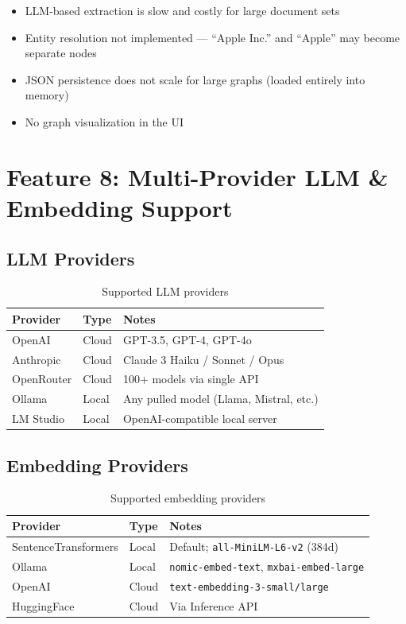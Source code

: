 \documentclass[12pt, a4paper, oneside]{report}
\newcommand{\kw}[1]{\texttt{\small #1}}
\begin{document}
\begin{conbox}[Drawbacks]
\begin{itemize}
  \item LLM-based extraction is slow and costly for large document sets
  \item Entity resolution not implemented — ``Apple Inc.'' and ``Apple'' may become separate nodes
  \item JSON persistence does not scale for large graphs (loaded entirely into memory)
  \item No graph visualization in the UI
\end{itemize}
\end{conbox}

\section{Feature 8: Multi-Provider LLM \& Embedding Support}

\subsection*{LLM Providers}

\begin{table}[H]
\centering
{}
\begin{tabularx}{\linewidth}{llX}
\toprule
\rowcolor{rapidblue!10}
\textbf{Provider} & \textbf{Type} & \textbf{Notes} \\
\midrule
OpenAI & Cloud & GPT-3.5, GPT-4, GPT-4o \\
Anthropic & Cloud & Claude 3 Haiku / Sonnet / Opus \\
OpenRouter & Cloud & 100+ models via single API \\
Ollama & Local & Any pulled model (Llama, Mistral, etc.) \\
LM Studio & Local & OpenAI-compatible local server \\
\bottomrule
\end{tabularx}
\caption{Supported LLM providers}
\end{table}

\subsection*{Embedding Providers}

\begin{table}[H]
\centering
{}
\begin{tabularx}{\linewidth}{llX}
\toprule
\rowcolor{rapidblue!10}
\textbf{Provider} & \textbf{Type} & \textbf{Notes} \\
\midrule
SentenceTransformers & Local & Default; \kw{all-MiniLM-L6-v2} (384d) \\
Ollama & Local & \kw{nomic-embed-text}, \kw{mxbai-embed-large} \\
OpenAI & Cloud & \kw{text-embedding-3-small/large} \\
HuggingFace & Cloud & Via Inference API \\
\bottomrule
\end{tabularx}
\caption{Supported embedding providers}
\end{table}
\end{document}
